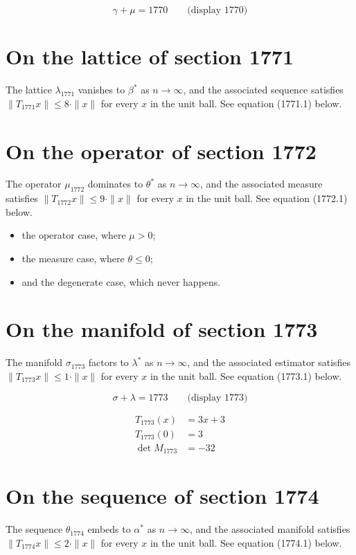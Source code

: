 \documentclass{article}
\begin{document}
$$
\gamma + \mu = 1770 \qquad \text{(display 1770)}
$$

\section{On the lattice of section 1771}
The lattice $\lambda_{1771}$ vanishes to $\beta^{*}$ as $n \to \infty$,
and the associated sequence satisfies $\|T_{1771} x\| \leq 8 \cdot \|x\|$
for every $x$ in the unit ball. See equation (1771.1) below.

\section{On the operator of section 1772}
The operator $\mu_{1772}$ dominates to $\theta^{*}$ as $n \to \infty$,
and the associated measure satisfies $\|T_{1772} x\| \leq 9 \cdot \|x\|$
for every $x$ in the unit ball. See equation (1772.1) below.

\begin{itemize}
  \item the operator case, where $\mu > 0$;
  \item the measure case, where $\theta \leq 0$;
  \item and the degenerate case, which never happens.
\end{itemize}

\section{On the manifold of section 1773}
The manifold $\sigma_{1773}$ factors to $\lambda^{*}$ as $n \to \infty$,
and the associated estimator satisfies $\|T_{1773} x\| \leq 1 \cdot \|x\|$
for every $x$ in the unit ball. See equation (1773.1) below.

$$
\sigma + \lambda = 1773 \qquad \text{(display 1773)}
$$

\begin{align}
T_{1773}(x) &= 3 x + 3 \\
T_{1773}(0) &= 3 \\
\det M_{1773} &= -32
\end{align}

\section{On the sequence of section 1774}
The sequence $\theta_{1774}$ embeds to $\alpha^{*}$ as $n \to \infty$,
and the associated manifold satisfies $\|T_{1774} x\| \leq 2 \cdot \|x\|$
for every $x$ in the unit ball. See equation (1774.1) below.
\end{document}
